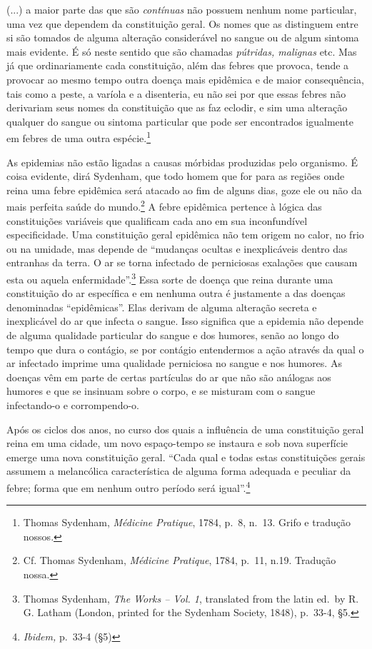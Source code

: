 (...) a maior parte das que são \emph{contínuas} não possuem nenhum nome
particular, uma vez que dependem da constituição geral. Os nomes que as
distinguem entre si são tomados de alguma alteração considerável no
sangue ou de algum sintoma mais evidente. É só neste sentido que são
chamadas \emph{pútridas, malignas} etc. Mas já que ordinariamente cada
constituição, além das febres que provoca, tende a provocar ao mesmo
tempo outra doença mais epidêmica e de maior consequência, tais como a
peste, a varíola e a disenteria, eu não sei por que essas febres não
derivariam seus nomes da constituição que as faz eclodir, e sim uma
alteração qualquer do sangue ou sintoma particular que pode ser
encontrados igualmente em febres de uma outra espécie.\footnote{Thomas
  Sydenham, \emph{Médicine Pratique}, 1784, p.~8, n.~13. Grifo e
  tradução nossos.}

As epidemias não estão ligadas a causas mórbidas produzidas pelo
organismo. É coisa evidente, dirá Sydenham, que todo homem que for para
as regiões onde reina uma febre epidêmica será atacado ao fim de alguns
dias, goze ele ou não da mais perfeita saúde do mundo.\footnote{Cf.
  Thomas Sydenham, \emph{Médicine Pratique}, 1784, p.~11, n.19. Tradução
  nossa.} A febre epidêmica pertence à lógica das constituições
variáveis que qualificam cada ano em sua inconfundível especificidade.
Uma constituição geral epidêmica não tem origem no calor, no frio ou na
umidade, mas depende de ``mudanças ocultas e inexplicáveis dentro das
entranhas da terra. O ar se torna infectado de perniciosas exalações que
causam esta ou aquela enfermidade''.\footnote{Thomas Sydenham, \emph{The
  Works -- Vol. 1}, translated from the latin ed.~by R. G. Latham
  (London, printed for the Sydenham Society, 1848), p.~33-4, §5.} Essa
sorte de doença que reina durante uma constituição do ar específica e em
nenhuma outra é justamente a das doenças denominadas ``epidêmicas''.
Elas derivam de alguma alteração secreta e inexplicável do ar que
infecta o sangue. Isso significa que a epidemia não depende de alguma
qualidade particular do sangue e dos humores, senão ao longo do tempo
que dura o contágio, se por contágio entendermos a ação através da qual
o ar infectado imprime uma qualidade perniciosa no sangue e nos humores.
As doenças vêm em parte de certas partículas do ar que não são análogas
aos humores e que se insinuam sobre o corpo, e se misturam com o sangue
infectando-o e corrompendo-o.

Após os ciclos dos anos, no curso dos quais a influência de uma
constituição geral reina em uma cidade, um novo espaço-tempo se instaura
e sob nova superfície emerge uma nova constituição geral. ``Cada qual e
todas estas constituições gerais assumem a melancólica característica de
alguma forma adequada e peculiar da febre; forma que em nenhum outro
período será igual''.\footnote{\emph{Ibidem,} p.~33-4 (§5)}

